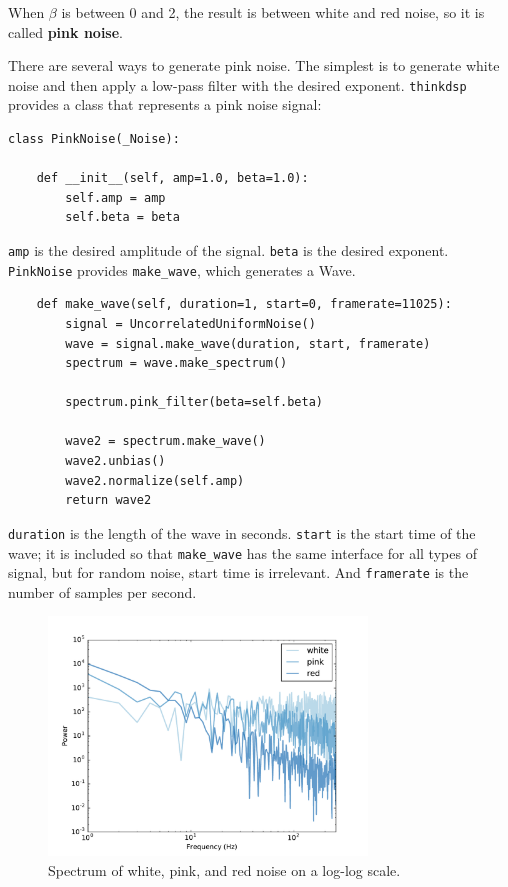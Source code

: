 \documentclass[12pt]{book}
\begin{document}
When $\beta$ is between 0 and 2, the result is between white and
red noise, so it is called {\bf pink noise}.

There are several ways to generate pink noise.  The simplest is to
generate white noise and then apply a low-pass filter with the
desired exponent.  {\tt thinkdsp} provides a class that represents
a pink noise signal:

\begin{verbatim}
class PinkNoise(_Noise):

    def __init__(self, amp=1.0, beta=1.0):
        self.amp = amp
        self.beta = beta
\end{verbatim}

{\tt amp} is the desired amplitude of the signal.
{\tt beta} is the desired exponent.  {\tt PinkNoise} provides
\verb"make_wave", which generates a Wave.

\begin{verbatim}
    def make_wave(self, duration=1, start=0, framerate=11025):
        signal = UncorrelatedUniformNoise()
        wave = signal.make_wave(duration, start, framerate)
        spectrum = wave.make_spectrum()

        spectrum.pink_filter(beta=self.beta)

        wave2 = spectrum.make_wave()
        wave2.unbias()
        wave2.normalize(self.amp)
        return wave2
\end{verbatim}

{\tt duration} is the length of the wave in seconds.  {\tt start} is
the start time of the wave; it is included so that \verb"make_wave"
has the same interface for all types of signal, but for random noise,
start time is irrelevant.  And {\tt framerate} is the number of
samples per second.

\begin{figure}
\centerline{\includegraphics[height=2.5in]{figs/noise-triple.pdf}}
\caption{Spectrum of white, pink, and red noise on a log-log scale.}
\label{fig.noise-triple}
\end{figure}
\end{document}
